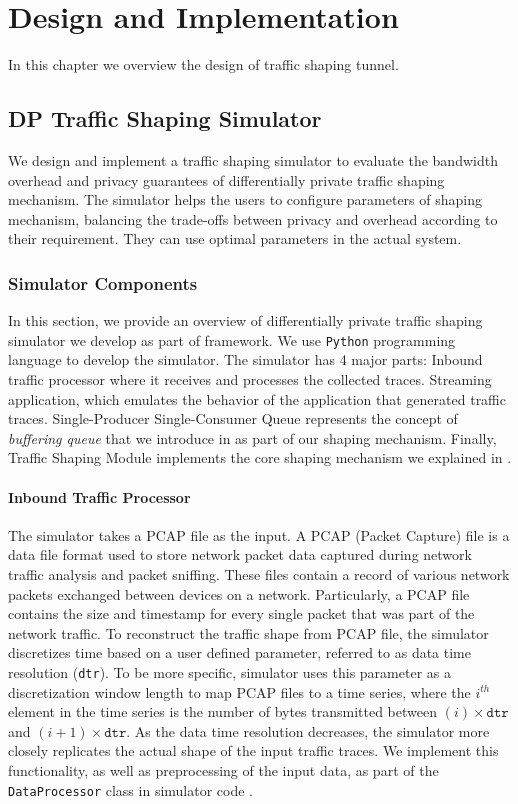 \chapter{Design and Implementation}\label{ch:design-implementation}
In this chapter we overview the design of {\sys} traffic shaping tunnel. 


\section{DP Traffic Shaping Simulator}\label{s}
We design and implement a traffic shaping simulator to evaluate the bandwidth overhead and privacy guarantees of {\sys} differentially private traffic shaping mechanism.
The simulator helps the users to configure parameters of {\sys} shaping mechanism, balancing the trade-offs between privacy and overhead according to their requirement.
They can use optimal parameters in the actual {\sys} system.


\subsection{Simulator Components}
In this section, we provide an overview of differentially private traffic shaping simulator we develop as part of {\sys} framework.
We use \texttt{Python} programming language to develop the simulator. 
The simulator has 4 major parts: 
Inbound traffic processor where it receives and processes the collected traces.
Streaming application, which emulates the behavior of the application that generated traffic traces.
Single-Producer Single-Consumer Queue represents the concept of \textit{buffering queue} that we introduce in  as part of our shaping mechanism.
Finally, Traffic Shaping Module implements the core shaping mechanism we explained in .

\subsubsection{Inbound Traffic Processor}\label{subsubsec:design-sim-inbound}
The simulator takes a PCAP file as the input. 
A PCAP (Packet Capture) file is a data file format used to store network packet data captured during network traffic analysis and packet sniffing.
These files contain a record of various network packets exchanged between devices on a network.
Particularly, a PCAP file contains the size and timestamp for every single packet that was part of the network traffic.
To reconstruct the traffic shape from PCAP file, the simulator discretizes time based on a user defined parameter, referred to as data time resolution (\texttt{dtr}).
To be more specific, simulator uses this parameter as a discretization window length to map PCAP files to a time series, where the $i^{th}$ element in the time series is the number of bytes transmitted between $(i) \times \texttt{dtr}$ and $(i+1) \times \texttt{dtr}$. 
As the data time resolution decreases, the simulator more closely replicates the actual shape of the input traffic traces.
We implement this functionality, as well as preprocessing of the input data, as part of the \texttt{DataProcessor} class in simulator code {\addref}.

